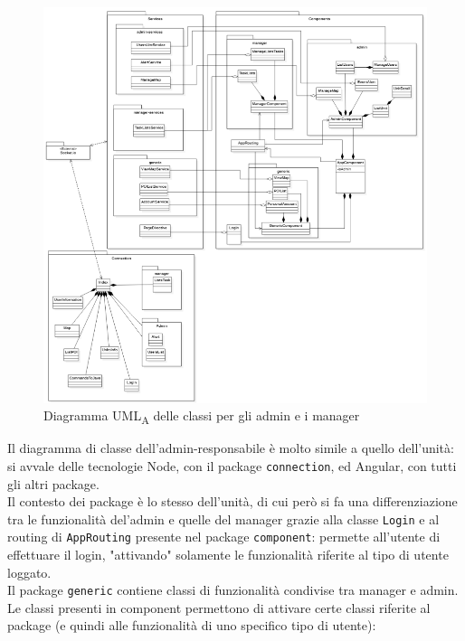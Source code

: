 \begin{figure}[H]
	\centering
	\includegraphics[scale=0.6]{res/images/UML_admin-manager.png}
	\caption{Diagramma UML\textsubscript{A} delle classi per gli admin e i manager}
\end{figure}
Il diagramma di classe dell'admin-responsabile è molto simile a quello dell'unità: si avvale delle tecnologie Node, con il package \texttt{connection}, ed Angular, con tutti gli altri package.\\
Il contesto dei package è lo stesso dell'unità, di cui però si fa una differenziazione tra le funzionalità del'admin e quelle del manager grazie alla classe \texttt{Login} e al routing di \texttt{AppRouting} presente nel package \texttt{component}: permette all'utente di effettuare il login, "attivando" solamente le funzionalità riferite al tipo di utente loggato.\\
Il package \texttt{generic} contiene classi di funzionalità condivise tra manager e admin.\\
Le classi presenti in component permettono di attivare certe classi riferite al package (e quindi alle funzionalità di uno specifico tipo di utente):
